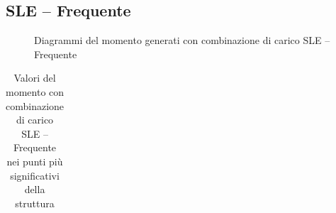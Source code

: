 \begin{landscape}
\subsection*{SLE -- Frequente}
\begin{figure}[H]
\centering
{} 
\caption{Diagrammi del momento generati con combinazione di carico SLE -- Frequente}
\label{fig:Momenti_SLSfrequent}
\end{figure}
\begin{table}[H]
\centering
\caption{Valori del momento con combinazione di carico SLE -- Frequente nei punti più significativi della struttura}
	\begin{tabular}{lS[table-format=3.2]S[table-format=3.2]S[table-format=3.2]S[table-format=3.2]S[table-format=3.2]S[table-format=3.2]S[table-format=3.2]S[table-format=3.2]S[table-format=3.2]S[table-format=3.2]S[table-format=3.2]S[table-format=3.2]S[table-format=3.2]}

\end{tabular}
\end{table}
\end{landscape}
